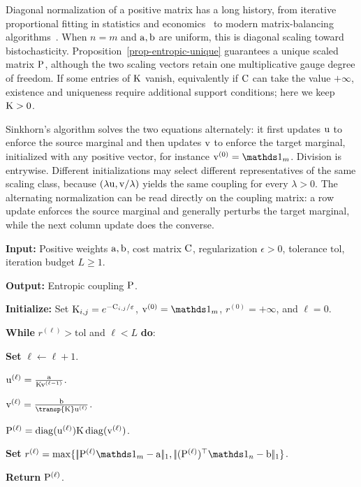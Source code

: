 Diagonal normalization of a positive matrix has a long history, from iterative proportional fitting in statistics and economics~\cite{kruithof,yule1912methods,Galichon-Entropic} to modern matrix-balancing algorithms~\cite{ReviewSinkhorn,cohen2017matrix}.
%
When $n=m$ and $\a,\b$ are uniform, this is diagonal scaling toward bistochasticity. Proposition~\ref{prop-entropic-unique} guarantees a unique scaled matrix $\P$, although the two scaling vectors retain one multiplicative gauge degree of freedom. If some entries of $\K$ vanish, equivalently if $\C$ can take the value $+\infty$, existence and uniqueness require additional support conditions; here we keep $\K>0$.


Sinkhorn's algorithm solves the two equations alternately: it first updates $\uD$ to enforce the source marginal and then updates $\vD$ to enforce the target marginal,
\eql{\label{eq-sinkhorn}
	\itt{\uD} \eqdef \frac{\a}{\K \it{\vD}}
	\qandq
	\itt{\vD} \eqdef \frac{\b}{\transp{\K}\itt{\uD}},
}
initialized with any positive vector, for instance $\init{\vD}=\ones_m$. Division is entrywise. Different initializations may select different representatives of the same scaling class, because $(\lambda\uD,\vD/\lambda)$ yields the same coupling for every $\lambda>0$.
%
The alternating normalization can be read directly on the coupling matrix: a row update enforces the source marginal and generally perturbs the target marginal, while the next column update does the converse.

\begin{alg}\label{alg:sinkhorn-scaling}
\textbf{Input:} Positive weights $\a,\b$, cost matrix $\C$, regularization $\epsilon>0$, tolerance $\mathrm{tol}$, iteration budget $L\geq1$.

\textbf{Output:} Entropic coupling $\P$.

\textbf{Initialize:} Set $\K_{i,j}=e^{-\C_{i,j}/\epsilon}$, $\vD^{(0)}=\ones_m$, \(r^{(0)}=+\infty\), and \(\ell=0\).

\textbf{While} \(r^{(\ell)}>\mathrm{tol}\) and $\ell<L$ \textbf{do}:
\begin{algblock}

\textbf{Set} \(\ell\leftarrow \ell+1\).

\(\uD^{(\ell)}=\frac{\a}{\K\vD^{(\ell-1)}}\).

\(\vD^{(\ell)}=\frac{\b}{\transp{\K}\uD^{(\ell)}}\).

\(\P^{(\ell)}=\diag(\uD^{(\ell)})\K\diag(\vD^{(\ell)})\).

\textbf{Set} \(r^{(\ell)}=\max\{\norm{\P^{(\ell)}\ones_m-\a}_1,\norm{(\P^{(\ell)})^\top\ones_n-\b}_1\}\).
\end{algblock}
\algreturnskip
\textbf{Return} \(\P^{(\ell)}\).
\end{alg}

